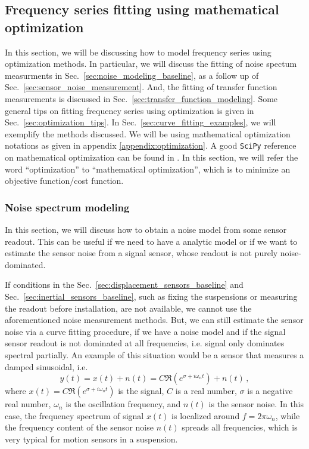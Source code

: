 \subsection{Frequency series fitting using mathematical optimization}
In this section, we will be discussing how to model frequency series using optimization methods.
In particular, we will discuss the fitting of noise spectum measurments in Sec.~\ref{sec:noise_modeling_baseline}, as a follow up of Sec.~\ref{sec:sensor_noise_measurement}.
And, the fitting of transfer function measurements is discussed in Sec.~\ref{sec:transfer_function_modeling}.
Some general tips on fitting frequency series using optimization is given in Sec.~\ref{sec:optimization_tips}.
In Sec.~\ref{sec:curve_fitting_examples}, we will exemplify the methods discussed.
We will be using mathematical optimization notations as given in appendix \ref{appendix:optimization}.
A good \verb|SciPy| reference on mathematical optimization can be found in \cite{scipy_mathematical_optimization}.
In this section, we will refer the word ``optimization'' to ``mathematical optimization'', which is to minimize an objective function/cost function.
\subsubsection{Noise spectrum modeling \label{sec:noise_modeling_baseline}}
In this section, we will discuss how to obtain a noise model from some sensor readout.
This can be useful if we need to have a analytic model or if we want to estimate the sensor noise from a signal sensor, whose readout is not purely noise-dominated.

If conditions in the Sec.~\ref{sec:displacement_sensors_baseline} and Sec.~\ref{sec:inertial_sensors_baseline}, such as fixing the suspensions or measuring the readout before installation, are not available, we cannot use the aforementioned noise measurement methods.
But, we can still estimate the sensor noise via a curve fitting procedure, if we have a noise model and if the signal sensor readout is not dominated at all frequencies, i.e. signal only dominates spectral partially.
An example of this situation would be a sensor that measures a damped sinusoidal, i.e.
\begin{equation}
	y(t) = x(t) + n(t) = C\Re{\left(e^{\sigma+i\omega_n t}\right)} + n(t)\,,
\end{equation}
where $x(t) = C\Re{\left(e^{\sigma+i\omega_n t}\right)}$ is the signal, $C$ is a real number, $\sigma$ is a negative real number, $\omega_n$ is the oscillation frequency, and $n(t)$ is the sensor noise.
In this case, the frequency spectrum of signal $x(t)$ is localized around $f=2\pi\omega_n$, while the frequency content of the sensor noise $n(t)$ spreads all frequencies, which is very typical for motion sensors in a suspension.

